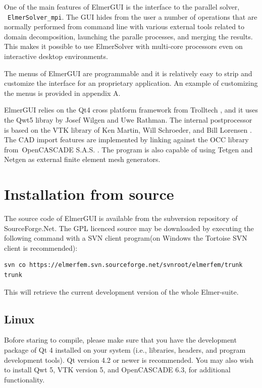 \documentclass[a4paper,12pt]{article}
\begin{document}
One of the main features of ElmerGUI is the interface to the parallel solver,  {\tt ElmerSolver\_mpi}.
The GUI hides from the user a number of operations that are normally performed from command line with various external tools related to domain decomposition, launching the paralle processes, and merging the results. This makes it possible to use ElmerSolver with multi-core processors even on interactive desktop
environments.

The menus of ElmerGUI are programmable and it is relatively easy to strip and customize the interface
for an proprietary application. An example of customizing the menus is provided in appendix A.

ElmerGUI relies on the Qt4 cross platform framework from Trolltech \cite{QtHome}, and it uses the Qwt5
libray by Josef Wilgen and Uwe Rathman\cite{QwtHome}. The internal postprocessor is based on the VTK  library of Ken Martin, Will Schroeder, and Bill Lorensen \cite{VTKHome}. The CAD import features are
implemented by linking against the OCC library from OpenCASCADE S.A.S. \cite{OCCHome}. The program is
also capable of using Tetgen \cite{TetgenHome} and Netgen \cite{NetgenHome} as external finite element
mesh generators.

\section{Installation from source}

The source code of ElmerGUI is available from the subversion repository of SourceForge.Net. The GPL
licenced source may be downloaded by executing the following command with a SVN client program(on
Windows the Tortoise SVN client is recommended):

\begin{footnotesize}
\begin{verbatim}
svn co https://elmerfem.svn.sourceforge.net/svnroot/elmerfem/trunk trunk
\end{verbatim}
\end{footnotesize}
\noindent This will retrieve the current development version of the whole Elmer-suite.

\subsection{Linux}

Bofore staring to compile, please make sure that you have the development package of Qt 4
installed on your system (i.e., libraries, headers, and program development tools). Qt version 4.2
or newer is recommended. You may also wish to install Qwt 5, VTK version 5, and OpenCASCADE 6.3, 
for additional functionality.
\end{document}
